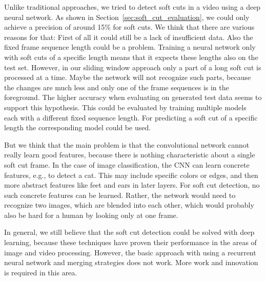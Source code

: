 Unlike traditional approaches, we tried to detect soft cuts in a video using a deep neural network.
As shown in Section~\ref{sec:soft_cut_evaluation}, we could only achieve a precision of around 15\% for soft cuts.
We think that there are various reasons for that:
First of all it could still be a lack of insufficient data.
Also the fixed frame sequence length could be a problem.
Training a neural network only with soft cuts of a specific length means that it expects these lengths also on the test set.
However, in our sliding window approach only a part of a long soft cut is processed at a time.
Maybe the network will not recognize such parts, because the changes are much less and only one of the frame sequences is in the foreground.
The higher accuracy when evaluating on generated test data seems to support this hypothesis.
This could be evaluated by training multiple models each with a different fixed sequence length.
For predicting a soft cut of a specific length the corresponding model could be used.

But we think that the main problem is that the convolutional network cannot really learn good features, because there is nothing characteristic about a single soft cut frame.
In the case of image classification, the CNN can learn concrete features, e.g., to detect a cat.
This may include specific colors or edges, and then more abstract features like feet and ears in later layers.
For soft cut detection, no such concrete features can be learned.
Rather, the network would need to recognize two images, which are blended into each other, which would probably also be hard for a human by looking only at one frame.

In general, we still believe that the soft cut detection could be solved with deep learning, because these techniques have proven their performance in the areas of image and video processing.
However, the basic approach with using a recurrent neural network and merging strategies does not work.
More work and innovation is required in this area.
